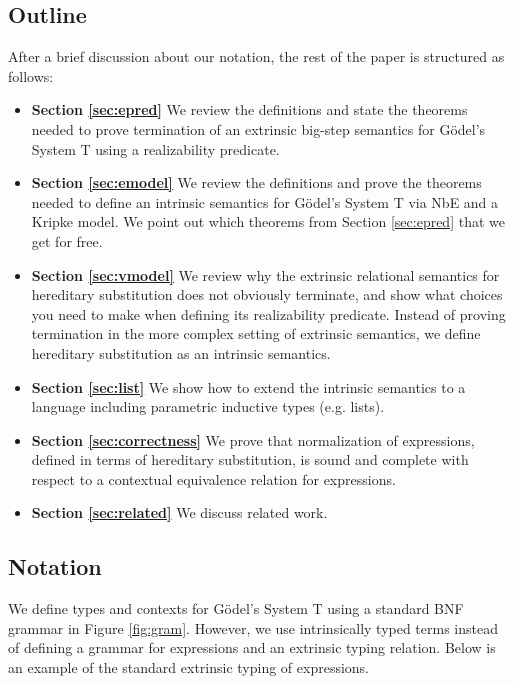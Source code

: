\documentclass[preprint,nonatbib]{sigplanconf}
\numberwithin{subdefin}{defin}
\theoremstyle{definition}
\numberwithin{subtheorem}{theorem}
\numberwithin{sublemma}{theorem}
\numberwithin{corollary}{theorem}
\numberwithin{case}{theorem}
\numberwithin{slcase}{sublemma}
\numberwithin{scase}{subtheorem}
\numberwithin{lcase}{lemma}
\newcommand{\reffig}[1]{Figure \ref{fig:#1}}
\newcommand{\refsec}[1]{Section \ref{sec:#1}}
\begin{document}
\subsection{Outline}

After a brief discussion about our notation, the rest of the paper is
structured as follows:

\begin{itemize}
\item{\bf{\refsec{epred}}}
We review the definitions and state the theorems needed to prove termination of
an extrinsic big-step semantics for G{\"o}del's System T using a
realizability predicate.

\item{\bf{\refsec{emodel}}}
We review the definitions and prove the theorems needed to define an
intrinsic semantics for G{\"o}del's System T via NbE and a Kripke
model. We point out which theorems from \refsec{epred} that we get for
free.

\item{\bf{\refsec{vmodel}}}
We review why the extrinsic relational semantics for hereditary
substitution does not obviously terminate, and show what choices you
need to make when defining its realizability predicate. Instead of
proving termination in the more complex setting of extrinsic
semantics, we define hereditary substitution as an intrinsic
semantics.

\item{\bf{\refsec{list}}}
We show how to extend the intrinsic semantics to a language including
parametric inductive types (e.g. lists).

\item{\bf{\refsec{correctness}}}
We prove that normalization of expressions, defined in terms of
hereditary substitution, is sound and complete with respect to a
contextual equivalence relation for expressions.

\item{\bf{\refsec{related}}}
We discuss related work.
\end{itemize}

\subsection{Notation}

We define types and contexts for G{\"o}del's System T using a standard
BNF grammar in \reffig{gram}. However, we use intrinsically typed
terms instead of defining a grammar for expressions and an extrinsic
typing relation. Below is an example of the standard extrinsic typing
of expressions.
\end{document}
